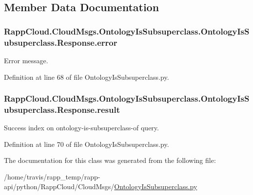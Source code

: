 \subsection{Member Data Documentation}
\hypertarget{classRappCloud_1_1CloudMsgs_1_1OntologyIsSubsuperclass_1_1OntologyIsSubsuperclass_1_1Response_a8e8e0b4bdc4b8d7af99bb4b393e71ac4}{
\subsubsection[{error}]{\setlength{\rightskip}{0pt plus 5cm}Rapp\-Cloud.\-Cloud\-Msgs.\-Ontology\-Is\-Subsuperclass.\-Ontology\-Is\-Subsuperclass.\-Response.\-error}}\label{classRappCloud_1_1CloudMsgs_1_1OntologyIsSubsuperclass_1_1OntologyIsSubsuperclass_1_1Response_a8e8e0b4bdc4b8d7af99bb4b393e71ac4}


Error message. 



Definition at line 68 of file Ontology\-Is\-Subsuperclass.\-py.

\hypertarget{classRappCloud_1_1CloudMsgs_1_1OntologyIsSubsuperclass_1_1OntologyIsSubsuperclass_1_1Response_a7edb2bb06aa0ffe0bd11cd2e0050c844}{
\subsubsection[{result}]{\setlength{\rightskip}{0pt plus 5cm}Rapp\-Cloud.\-Cloud\-Msgs.\-Ontology\-Is\-Subsuperclass.\-Ontology\-Is\-Subsuperclass.\-Response.\-result}}\label{classRappCloud_1_1CloudMsgs_1_1OntologyIsSubsuperclass_1_1OntologyIsSubsuperclass_1_1Response_a7edb2bb06aa0ffe0bd11cd2e0050c844}


Success index on ontology-\/is-\/subsuperclass-\/of query. 



Definition at line 70 of file Ontology\-Is\-Subsuperclass.\-py.



The documentation for this class was generated from the following file\-:\begin{DoxyCompactItemize}
\item 
/home/travis/rapp\-\_\-temp/rapp-\/api/python/\-Rapp\-Cloud/\-Cloud\-Msgs/\hyperlink{OntologyIsSubsuperclass_8py}{Ontology\-Is\-Subsuperclass.\-py}\end{DoxyCompactItemize}

